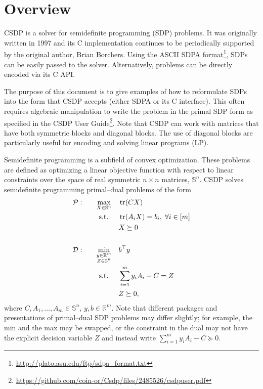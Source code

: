 \documentclass[a4paper]{article}
\begin{document}
\section*{Overview}
CSDP is a solver for semidefinite programming (SDP) problems.
It was originally written in 1997 and its C implementation continues to be periodically supported by the original author, Brian Borchers.
Using the ASCII SDPA format\footnote{\url{http://plato.asu.edu/ftp/sdpa_format.txt}}, SDPs can be easily passed to the solver.
Alternatively, problems can be directly encoded via its C API.

The purpose of this document is to give examples of how to reformulate SDPs into the form that CSDP accepts (either SDPA or its C interface).
This often requires algebraic manipulation to write the problem in the primal SDP form as specified in the CSDP User Guide\footnote{\url{https://github.com/coin-or/Csdp/files/2485526/csdpuser.pdf}}.
Note that CSDP can work with matrices that have both symmetric blocks and diagonal blocks.
The use of diagonal blocks are particularly useful for encoding and solving linear programs (LP).

Semidefinite programming is a subfield of convex optimization.
These problems are defined as optimizing a linear objective function with respect to linear constraints over the space of real symmetric $n\times n$ matrices, $\mathbb{S}^n$.
CSDP solves semidefinite programming primal--dual problems of the form
\begin{equation*}
\begin{aligned}
\mathcal{P}: \quad && \max_{X\in\mathbb{S}^n}                 \quad & \tr(CX) \\
                   && \textrm{s.t. } \quad & \tr(A_iX) = b_i, \;\forall i\in[m] \\
                   &&                     & X \succeq 0 \\ \\
\mathcal{D}: \quad && \min_{\substack{y\in\mathbb{R}^m\\Z\in\mathbb{S}^n}}\quad & b^\top y \\
                   && \textrm{s.t. } \quad & \sum_{i=1}^m y_i A_i - C = Z\\
                   &&                     & Z \succeq 0,
\end{aligned}
\end{equation*}
where $C, A_1,\dots,A_m\in\mathbb{S}^n$, $y,b\in\mathbb{R}^m$.
Note that different packages and presentations of primal--dual SDP problems may differ slightly; for example, the min and the max may be swapped, or the constraint in the dual may not have the explicit decision variable $Z$ and instead write $\sum_{i=1}^m y_i A_i - C\succeq 0$.
\end{document}
